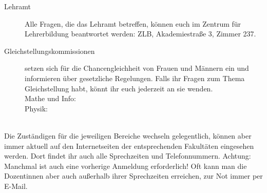 \begin{description}
    \item[Lehramt] Alle Fragen, die das Lehramt betreffen, können euch im Zentrum für Lehrerbildung beantwortet werden: ZLB, Akademiestraße 3, Zimmer 237.

    \item[Gleichstellungskommissionen] setzen sich für die Chancengleichheit von Frauen und Männern ein und informieren über gesetzliche Regelungen. Falls ihr Fragen zum Thema Gleichstellung habt, könnt ihr euch jederzeit an sie wenden.\\
    Mathe und Info: \email{\gleichstellungsbeauftragtemathe} \\
    Physik: \gleichstellungsbeauftragtephysik\\
    \email{\gleichstellungsbeauftragtephysikemail} \\
\end{description}

\noindent Die Zuständigen für die jeweiligen Bereiche wechseln gelegentlich, können aber immer aktuell auf den Internetseiten der entsprechenden Fakultäten eingesehen werden. Dort findet ihr auch alle Sprechzeiten und Telefonnummern. Achtung: Manchmal ist auch eine vorherige Anmeldung erforderlich! Oft kann man die Dozentinnen aber auch außerhalb ihrer Sprechzeiten erreichen, zur Not immer per E-Mail.\\[.9cm]

\relax

